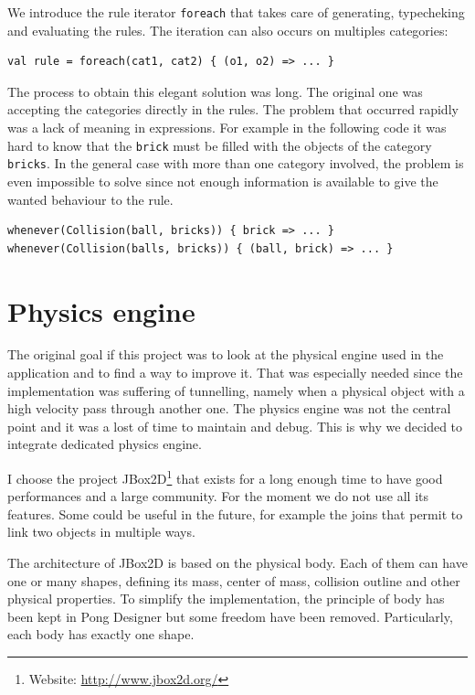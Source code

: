 \documentclass[11pt,a4paper]{article}
\begin{document}
We introduce the rule iterator \texttt{foreach} that takes care of generating, typecheking and evaluating the rules. The iteration can also occurs on multiples categories:

\begin{lstlisting}
val rule = foreach(cat1, cat2) { (o1, o2) => ... }
\end{lstlisting}

The process to obtain this elegant solution was long. The original one was accepting the categories directly in the rules. The problem that occurred rapidly was a lack of meaning in expressions. For example in the following code it was hard to know that the \texttt{brick} must be filled with the objects of the category \texttt{bricks}. In the general case with more than one category involved, the problem is even impossible to solve since not enough information is available to give the wanted behaviour to the rule.
\begin{lstlisting}
whenever(Collision(ball, bricks)) { brick => ... }
whenever(Collision(balls, bricks)) { (ball, brick) => ... }
\end{lstlisting}

\section{Physics engine}
The original goal if this project was to look at the physical engine used in the application and to find a way to improve it. That was especially needed since the implementation was suffering of tunnelling, namely when a physical object with a high velocity pass through another one. The physics engine was not the central point and it was a lost of time to maintain and debug. This is why we decided to integrate dedicated physics engine. 

I choose the project JBox2D\footnote{Website: \url{http://www.jbox2d.org/}} that exists for a long enough time to have good performances and a large community. For the moment we do not use all its features. Some could be useful in the future, for example the joins that permit to link two objects in multiple ways.

The architecture of JBox2D is based on the physical body. Each of them can have one or many shapes, defining its mass, center of mass, collision outline and other physical properties. To simplify the implementation, the principle of body has been kept in Pong Designer but some freedom have been removed. Particularly, each body has exactly one shape.
\end{document}
